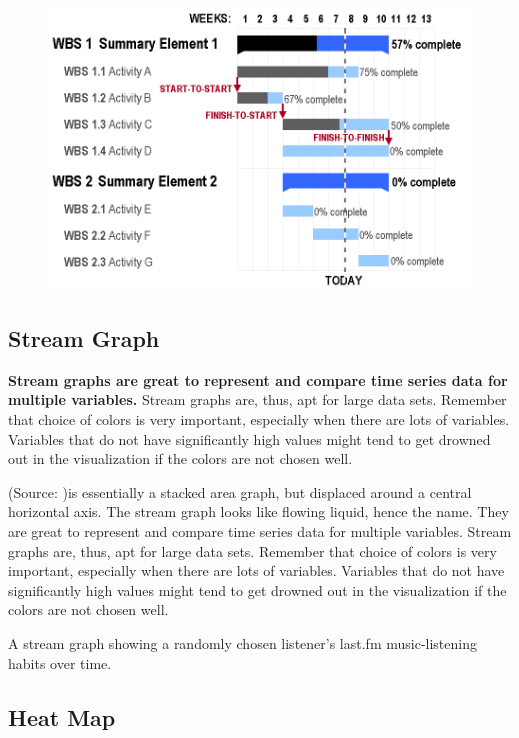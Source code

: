 \documentclass[]{book}
\theoremstyle{definition}
\theoremstyle{definition}
\theoremstyle{definition}
\theoremstyle{remark}
\begin{document}
\begin{figure}
\centering
\includegraphics{images/aya-gantt.png}
\caption{}
\end{figure}

\subsection{Stream Graph}\label{stream-graph}

\textbf{Stream graphs are great to represent and compare time series
data for multiple variables.} Stream graphs are, thus, apt for large
data sets. Remember that choice of colors is very important, especially
when there are lots of variables. Variables that do not have
significantly high values might tend to get drowned out in the
visualization if the colors are not chosen well.

(Source: \citep{aya-time-series})is essentially a stacked area graph,
but displaced around a central horizontal axis. The stream graph looks
like flowing liquid, hence the name. They are great to represent and
compare time series data for multiple variables. Stream graphs are,
thus, apt for large data sets. Remember that choice of colors is very
important, especially when there are lots of variables. Variables that
do not have significantly high values might tend to get drowned out in
the visualization if the colors are not chosen well.

A stream graph showing a randomly chosen listener's last.fm
music-listening habits over time.

\subsection{Heat Map}\label{heat-map}
\end{document}
